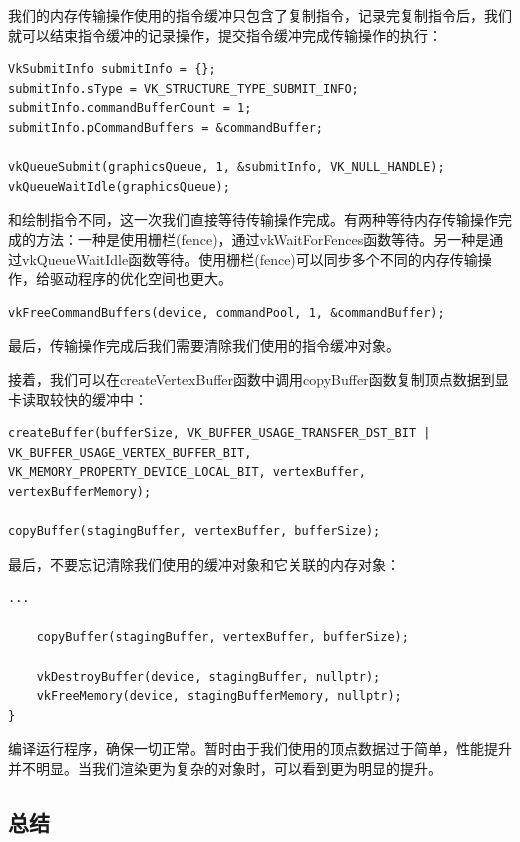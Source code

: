 \documentclass{ctexart}
\begin{document}
我们的内存传输操作使用的指令缓冲只包含了复制指令，记录完复制指令后，我们就可以结束指令缓冲的记录操作，提交指令缓冲完成传输操作的执行：

\begin{lstlisting}[language={[ANSI]C}]
VkSubmitInfo submitInfo = {};
submitInfo.sType = VK_STRUCTURE_TYPE_SUBMIT_INFO;
submitInfo.commandBufferCount = 1;
submitInfo.pCommandBuffers = &commandBuffer;

vkQueueSubmit(graphicsQueue, 1, &submitInfo, VK_NULL_HANDLE);
vkQueueWaitIdle(graphicsQueue);
\end{lstlisting}

和绘制指令不同，这一次我们直接等待传输操作完成。有两种等待内存传输操作完成的方法：一种是使用栅栏(fence)，通过vkWaitForFences函数等待。另一种是通过vkQueueWaitIdle函数等待。使用栅栏(fence)可以同步多个不同的内存传输操作，给驱动程序的优化空间也更大。

\begin{lstlisting}[language={[ANSI]C}]
vkFreeCommandBuffers(device, commandPool, 1, &commandBuffer);
\end{lstlisting}

最后，传输操作完成后我们需要清除我们使用的指令缓冲对象。

接着，我们可以在createVertexBuffer函数中调用copyBuffer函数复制顶点数据到显卡读取较快的缓冲中：

\begin{lstlisting}[language={[ANSI]C}]
createBuffer(bufferSize, VK_BUFFER_USAGE_TRANSFER_DST_BIT | VK_BUFFER_USAGE_VERTEX_BUFFER_BIT, VK_MEMORY_PROPERTY_DEVICE_LOCAL_BIT, vertexBuffer, vertexBufferMemory);

copyBuffer(stagingBuffer, vertexBuffer, bufferSize);
\end{lstlisting}

最后，不要忘记清除我们使用的缓冲对象和它关联的内存对象：

\begin{lstlisting}[language={[ANSI]C}]
		...

	copyBuffer(stagingBuffer, vertexBuffer, bufferSize);

	vkDestroyBuffer(device, stagingBuffer, nullptr);
	vkFreeMemory(device, stagingBufferMemory, nullptr);
}
\end{lstlisting}

编译运行程序，确保一切正常。暂时由于我们使用的顶点数据过于简单，性能提升并不明显。当我们渲染更为复杂的对象时，可以看到更为明显的提升。

\subsection{总结}
\end{document}
